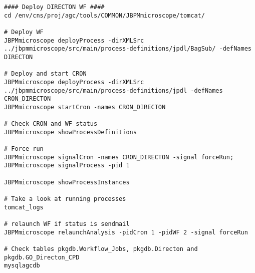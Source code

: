 \begin{lstlisting}[style=bash]
#### Deploy DIRECTON WF ####
cd /env/cns/proj/agc/tools/COMMON/JBPMmicroscope/tomcat/

# Deploy WF
JBPMmicroscope deployProcess -dirXMLSrc ../jbpmmicroscope/src/main/process-definitions/jpdl/BagSub/ -defNames DIRECTON

# Deploy and start CRON
JBPMmicroscope deployProcess -dirXMLSrc ../jbpmmicroscope/src/main/process-definitions/jpdl -defNames CRON_DIRECTON
JBPMmicroscope startCron -names CRON_DIRECTON

# Check CRON and WF status
JBPMmicroscope showProcessDefinitions

# Force run
JBPMmicroscope signalCron -names CRON_DIRECTON -signal forceRun; JBPMmicroscope signalProcess -pid 1

JBPMmicroscope showProcessInstances

# Take a look at running processes
tomcat_logs

# relaunch WF if status is sendmail
JBPMmicroscope relaunchAnalysis -pidCron 1 -pidWF 2 -signal forceRun

# Check tables pkgdb.Workflow_Jobs, pkgdb.Directon and pkgdb.GO_Directon_CPD
mysqlagcdb
\end{lstlisting}
